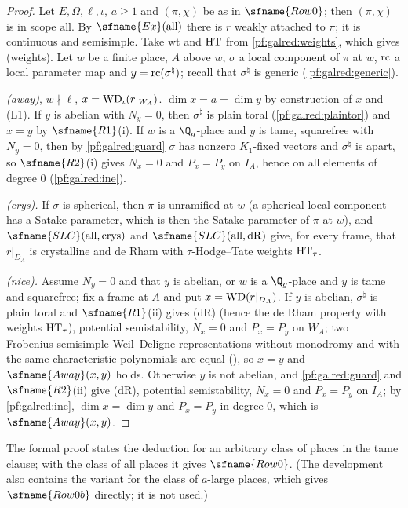 \begin{proof}
Let $E,\Omega,\ell,\iota$, $a\ge1$ and $(\pi,\chi)$ be as in $\sfname{Row0}$; then $(\pi,\chi)$ is in scope
$\mathrm{all}$. By $\sfname{Ex}(\mathrm{all})$ there is $r$ weakly attached to $\pi$; it is continuous and
semisimple. Take $\mathrm{wt}$ and $\mathrm{HT}$ from \cref{pf:galred:weights}, which gives (weights). Let $w$ be a
finite place, $A$ above $w$, $\sigma$ a local component of $\pi$ at $w$, $\mathrm{rc}$ a local parameter map and
$y=\mathrm{rc}(\sigma^\natural)$; recall that $\sigma^\natural$ is generic (\cref{pf:galred:generic}).

\emph{(away)}, $w\nmid\ell$, $x=\mathrm{WD}_\iota(r|_{W_A})$. $\dim x=a=\dim y$ by construction of $x$ and (L1). If $y$
is abelian with $N_y=0$, then $\sigma^\natural$ is plain toral (\cref{pf:galred:plaintor}) and $x=y$ by
$\sfname{R1}$(i). If $w$ is a $\Q_g$-place and $y$ is tame, squarefree with $N_y=0$, then by \cref{pf:galred:guard}
$\sigma$ has nonzero $K_1$-fixed vectors and $\sigma^\natural$ is apart, so $\sfname{R2}$(i) gives $N_x=0$ and $P_x=P_y$
on $I_A$, hence on all elements of degree $0$ (\cref{pf:galred:ine}).

\emph{(crys).} If $\sigma$ is spherical, then $\pi$ is unramified at $w$
(a spherical local component has a Satake parameter, which is then the Satake parameter of
$\pi$ at $w$), and $\sfname{SLC}(\mathrm{all},\mathrm{crys})$ and
$\sfname{SLC}(\mathrm{all},\mathrm{dR})$ give, for every frame, that $r|_{D_A}$ is crystalline and de Rham with
$\tau$-Hodge--Tate weights $\mathrm{HT}_\tau$.

\emph{(nice).} Assume $N_y=0$ and that $y$ is abelian, or $w$ is a $\Q_g$-place and $y$ is tame and squarefree; fix a
frame at $A$ and put $x=\mathrm{WD}(r|_{D_A})$. If $y$ is abelian, $\sigma^\natural$ is plain toral and $\sfname{R1}$(ii)
gives (dR) (hence the de Rham property with weights $\mathrm{HT}_\tau$), potential semistability, $N_x=0$ and $P_x=P_y$
on $W_A$; two Frobenius-semisimple Weil--Deligne representations without monodromy and with the same characteristic
polynomials are equal (), so $x=y$ and $\sfname{Away}(x,y)$
holds. Otherwise $y$ is not abelian, and \cref{pf:galred:guard} and $\sfname{R2}$(ii) give (dR), potential
semistability, $N_x=0$ and $P_x=P_y$ on $I_A$; by \cref{pf:galred:ine}, $\dim x=\dim y$ and $P_x=P_y$ in degree $0$,
which is $\sfname{Away}(x,y)$.
\end{proof}

The formal proof states the deduction for an arbitrary class of places in the tame clause; with the class of all
places it gives $\sfname{Row0}$. (The development also contains the variant for the class of $a$-large places, which
gives $\sfname{Row0b}$ directly; it is not used.)

